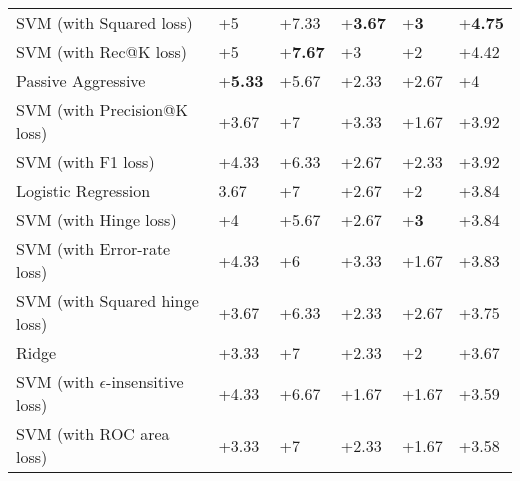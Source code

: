 \begin{table}[h!]
{\begin{tabular}{@{}llllll@{}}
SVM (with Squared loss)         		& +5                       & +7.33                       & +\textbf{3.67}           & +\textbf{3}                 & +\textbf{4.75}             \\
SVM (with Rec@K loss)                  		& +5                       & +\textbf{7.67}         	 & +{3}                     & +2                          & +{4.42}    \\
Passive Aggressive                         	& +\textbf{5.33}           & +5.67             		 & +2.33                    & +2.67                       & +4                \\
SVM (with Precision@K loss)                   	& +3.67                    & +7                          & +3.33                    & +{1.67}              	  & +3.92             \\
SVM (with F1 loss)                          	& +4.33                    & +6.33                       & +2.67                    & +2.33                       & +3.92             \\
Logistic Regression                        	& 3.67                     & +7                          & +2.67                    & +2                          & +3.84             \\
SVM (with Hinge loss)                      	& +4                       & +5.67                       & +2.67                    & +\textbf{3}              	  & +3.84             \\
SVM (with Error-rate loss)                   	& +4.33                    & +6                          & +3.33                    & +1.67                       & +3.83             \\
SVM (with Squared hinge loss)                	& +3.67                    & +6.33                       & +2.33                    & +2.67                       & +3.75             \\
Ridge                                      	& +3.33                    & +7                          & +2.33                    & +2                          & +3.67             \\
SVM (with $\epsilon$-insensitive loss)       	& +4.33                    & +6.67                       & +1.67                    & +1.67                       & +3.59             \\
SVM (with ROC area loss)                    	& +3.33                    & +7                          & +2.33                    & +1.67                       & +3.58             \\

\end{tabular}}
\end{table}
